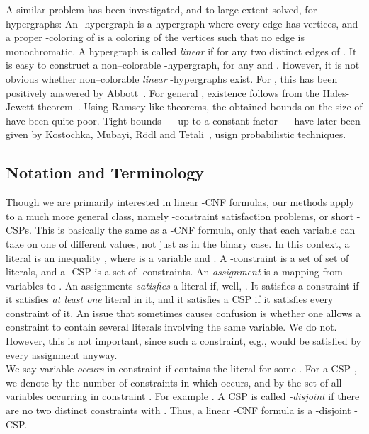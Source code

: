 \documentclass[envcountsect, envcountsame]{llncs}
\begin{document}
A similar problem has been investigated, and to large extent solved,
for hypergraphs: An -hypergraph  is a hypergraph where
every edge has  vertices, and a proper -coloring of
 is a coloring of the vertices such that no edge is
monochromatic. A hypergraph is called {\em linear} if  for any two distinct edges  of . It is
easy to construct a non--colorable -hypergraph, for any  and
.  However, it is not obvious whether non--colorable {\em
  linear} -hypergraphs exist. For , this has been positively
answered by Abbott~\cite{Abbott65}. For general , existence follows
from the Hales-Jewett theorem~\cite{HJ63}.  Using Ramsey-like
theorems, the obtained bounds on the size of  have been
quite poor.  Tight bounds --- up to a constant factor --- have later
been given by Kostochka, Mubayi, R\"odl and
Tetali~\cite{KMRT01}, usign probabilistic techniques.\\

\subsection{Notation and Terminology}

Though we are primarily interested in linear -CNF formulas, our
methods apply to a much more general class, namely -constraint
satisfaction problems, or short -CSPs. This is basically the
same as a -CNF formula, only that each variable can take on one
of  different values, not just  as in the binary case.  In this
context, a literal is an inequality , where  is a variable
and . A -constraint is a set of set of 
literals, and a -CSP is a set of -constraints.  An {\em
  assignment} is a mapping from variables to .  An
assignments  {\em satisfies} a literal  if, well,
. It satisfies a constraint if it satisfies {\em at
  least one} literal in it, and it satisfies a CSP if it satisfies
every constraint of it. An issue that sometimes causes confusion is
whether one allows a constraint to contain several literals involving
the same variable. We do not. However, this is not important, since
such a constraint, e.g.,  would be satisfied by
every assignment anyway. \\

We say variable  {\em occurs} in constraint  if  contains the
literal  for some . For a CSP ,
we denote by  the number of constraints  in which
 occurs, and by  the set of all variables occurring in
constraint . For example . A CSP  is called {\em -disjoint} if there are no
two distinct constraints  with .  Thus, a linear -CNF formula is a -disjoint
-CSP.
\end{document}

